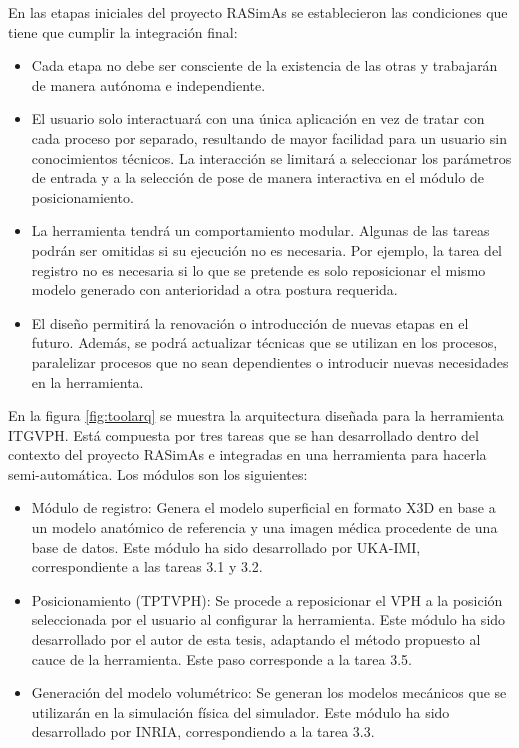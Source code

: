 
En las etapas iniciales del proyecto \ac{RASimAs} se establecieron las condiciones que tiene que cumplir la integración final:
\begin{itemize}
    \item Cada etapa no debe ser consciente de la existencia de las otras y trabajarán de manera autónoma e independiente.
    
    \item El usuario solo interactuará con una única aplicación en vez de tratar con cada proceso por separado, resultando de mayor facilidad para un usuario sin conocimientos técnicos. La interacción se limitará a seleccionar los parámetros de entrada y a la selección de pose de manera interactiva en el módulo de posicionamiento.
    
    \item La herramienta tendrá un comportamiento modular. Algunas de las tareas podrán ser omitidas si su ejecución no es necesaria. Por ejemplo, la tarea del registro no es necesaria si lo que se pretende es solo reposicionar el mismo modelo generado con anterioridad a otra postura requerida.
    
    \item El diseño permitirá la renovación o introducción de nuevas etapas en el futuro. Además, se podrá actualizar técnicas que se utilizan en los procesos, paralelizar procesos que no sean dependientes o introducir nuevas necesidades en la herramienta.
\end{itemize}

En la figura \ref{fig:toolarq} se muestra la arquitectura diseñada para la herramienta \ac{ITGVPH}.  Está compuesta por tres tareas que se han desarrollado dentro del contexto del proyecto \ac{RASimAs} e integradas en una herramienta para hacerla semi-automática. Los módulos son los siguientes: 
\begin{itemize}
    \item Módulo de registro:
    Genera el modelo superficial en formato \ac{X3D} en base a un modelo anatómico de referencia y una imagen médica procedente de una base de datos. Este módulo ha sido desarrollado por \ac{UKA-IMI}, correspondiente a las tareas 3.1 y 3.2.
    \item Posicionamiento (\ac{TPTVPH}):
    Se procede a reposicionar el \ac{VPH} a la posición seleccionada por el usuario al configurar la herramienta. Este módulo ha sido desarrollado por el autor de esta tesis, adaptando el método propuesto al cauce de la herramienta. Este paso corresponde a la tarea 3.5.
    \item Generación del modelo volumétrico:
    Se generan los modelos mecánicos que se utilizarán en la simulación física del simulador. Este módulo ha sido desarrollado por \ac{INRIA}, correspondiendo a la tarea 3.3.
\end{itemize}

